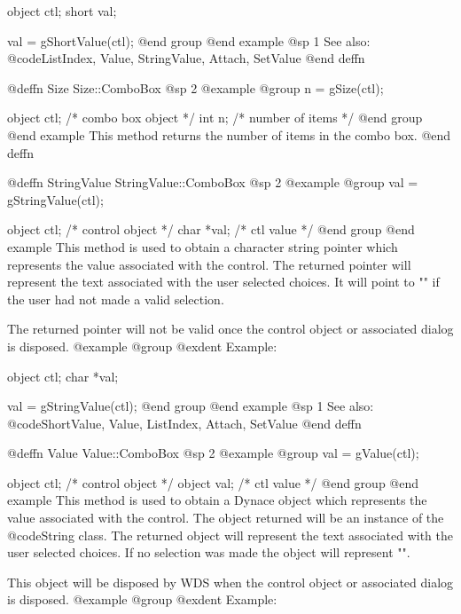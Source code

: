 {object  ctl;
short   val;

val = gShortValue(ctl);
@end group
@end example
@sp 1
See also:  @code{ListIndex, Value, StringValue, Attach, SetValue}
@end deffn



@deffn {Size} Size::ComboBox
@sp 2
@example
@group
n = gSize(ctl);

object  ctl;   /*  combo box object  */
int     n;     /*  number of items   */
@end group
@end example
This method returns the number of items in the combo box.
@end deffn










@deffn {StringValue} StringValue::ComboBox
@sp 2
@example
@group
val = gStringValue(ctl);

object  ctl;   /*  control object  */
char    *val;  /*  ctl value       */
@end group
@end example
This method is used to obtain a character string pointer which
represents the value associated with the control.  The returned pointer
will represent the text associated with the user selected choices.
It will point to "" if the user had not made a valid selection.

The returned pointer will not be valid once the control object or
associated dialog is disposed.
@example
@group
@exdent Example:

object  ctl;
char    *val;

val = gStringValue(ctl);
@end group
@end example
@sp 1
See also:  @code{ShortValue, Value, ListIndex, Attach, SetValue}
@end deffn










@deffn {Value} Value::ComboBox
@sp 2
@example
@group
val = gValue(ctl);

object  ctl;   /*  control object  */
object  val;   /*  ctl value       */
@end group
@end example
This method is used to obtain a Dynace object which represents the value
associated with the control.  The object returned will be an instance of
the @code{String} class.  The returned object will represent the text
associated with the user selected choices.  If no selection was made
the object will represent "".

This object will be disposed by WDS when the control object or
associated dialog is disposed.
@example
@group
@exdent Example:

}
